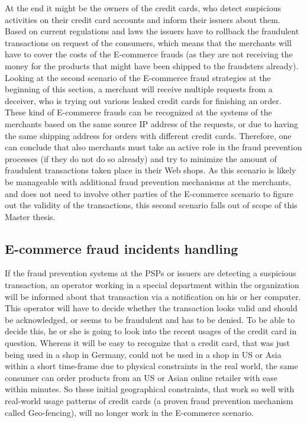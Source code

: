 At the end it might be the owners of the credit cards, who detect suspicious activities on their credit card accounts and inform their issuers about them. Based on current regulations and laws the issuers have to rollback the fraudulent transactions on request of the consumers, which means that the merchants will have to cover the costs of the \gls{E-commerce} frauds (as they are not receiving the money for the products that might have been shipped to the fraudsters already). \\

Looking at the second scenario of the \gls{E-commerce} fraud strategies at the beginning of this section, a merchant will receive multiple requests from a deceiver, who is trying out various leaked credit cards for finishing an order. These kind of \gls{E-commerce} frauds can be recognized at the systems of the merchants based on the same source \gls{IP} address of the requests, or due to having the same shipping address for orders with different credit cards. Therefore, one can conclude that also merchants must take an active role in the fraud prevention processes (if they do not do so already) and try to minimize the amount of fraudulent transactions taken place in their Web shops. As this scenario is likely be manageable with additional fraud prevention mechanisms at the merchants, and does not need to involve other parties of the \gls{E-commerce} scenario to figure out the validity of the transactions, this second scenario falls out of scope of this Master thesis.


\subsection{E-commerce fraud incidents handling}
\label{subsec:e_commerce_fraud_handling}

If the fraud prevention systems at the \gls{PSP}s or issuers are detecting a suspicious transaction, an operator working in a special department within the organization will be informed about that transaction via a notification on his or her computer. This operator will have to decide whether the transaction looks valid and should be acknowledged, or seems to be fraudulent and has to be denied. To be able to decide this, he or she is going to look into the recent usages of the credit card in question. Whereas it will be easy to recognize that a credit card, that was just being used in a shop in Germany, could not be used in a shop in US or Asia within a short time-frame due to physical constraints in the real world, the same consumer can order products from an US or Asian online retailer with ease within minutes. So these initial geographical constraints, that work so well with real-world usage patterns of credit cards (a proven fraud prevention mechanism called Geo-fencing), will no longer work in the \gls{E-commerce} scenario. \\


